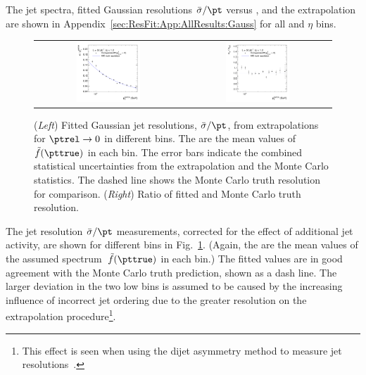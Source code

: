 The jet \pt spectra, fitted Gaussian resolutions $\bar{\sigma}/\pt$ versus \ptrel, and the extrapolation are shown in Appendix~\ref{sec:ResFit:App:AllResults:Gauss} for all \pt and $\eta$ bins.

\begin{figure}[ht]
  \centering
  \begin{tabular}{cc}
    \includegraphics[width=0.45\textwidth]{figures/ResFit_Spring10QCDFlat_Gauss_Eta0_ExtrapolatedResolution} &
    \includegraphics[width=0.45\textwidth]{figures/ResFit_Spring10QCDFlat_Gauss_Eta0_ExtrapolatedResolutionRatio}
  \end{tabular}
\caption{(\textit{Left}) Fitted Gaussian jet \pt resolutions, $\bar{\sigma}/\pt$, from extrapolations for \mbox{$\ptrel\rightarrow0$} in different \pt bins.
  The \pt are the mean values of $\tilde{f}(\pttrue)$ in each bin.
  The error bars indicate the combined statistical uncertainties from the extrapolation and the Monte Carlo statistics.
  The dashed line shows the Monte Carlo truth resolution for comparison.
  (\textit{Right}) Ratio of fitted and Monte Carlo truth resolution.}
\label{fig:ResFit:QCDMC:Extrapolation:Gauss:ResoVsPt}
\end{figure}

The jet \pt resolution $\bar{\sigma}/\pt$ measurements, corrected for the effect of additional jet activity, are shown for different \pt bins in Fig.~\ref{fig:ResFit:QCDMC:Extrapolation:Gauss:ResoVsPt}.
(Again, the \pt are the mean values of the assumed spectrum~$\tilde{f}(\pttrue)$ in each bin.)
The fitted values are in good agreement with the Monte Carlo truth prediction, shown as a dash line.
The larger deviation in the two low \pt bins is assumed to be caused by the increasing influence of incorrect jet ordering due to the greater resolution on the extrapolation procedure\footnote{This effect is seen when using the dijet asymmetry method to measure jet \pt resolutions~\cite{bib:cmspas:dijetasymm}.}.

